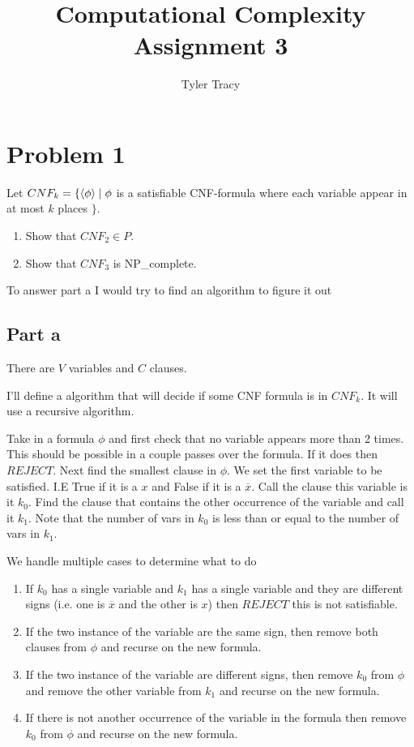 \documentclass[12pt]{article}
\title{Computational Complexity Assignment 3}
\author{Tyler Tracy}
\begin{document}
\maketitle

\section*{Problem 1}

\begin{questionbox}
	Let $CNF_k = \{ \braket{\phi} \mid \phi$ is a satisfiable CNF-formula where each variable appear in at most $k$ places $\}$.
	\begin{enumerate}[label=(\alph*)]
		\item Show that $CNF_2 \in P$.
		\item Show that $CNF_3$ is NP\_complete.
	\end{enumerate}
\end{questionbox}


To answer part a I would try to find an algorithm to figure it out

\subsection*{Part a}

There are $V$ variables and $C$ clauses.

I'll define a algorithm that will decide if some CNF formula is in $CNF_k$. It will use a recursive algorithm.


Take in a formula $\phi$ and first check that no variable appears more than 2 times. This should be possible in a couple passes over the formula. If it does then $REJECT$. Next find the smallest clause in $\phi$. We set the first variable to be satisfied. I.E True if it is a $x$ and False if it is a $\overline{x}$. Call the clause this variable is it $k_0$. Find the clause that contains the other occurrence of the variable and call it $k_1$. Note that the number of vars in $k_0$ is less than or equal to the number of vars in $k_1$.

We handle multiple cases to determine what to do

\begin{enumerate}
	\item If $k_0$ has a single variable and $k_1$ has a single variable and they are different signs (i.e. one is $\overline{x}$ and the other is $x$) then $REJECT$ this is not satisfiable.
	\item If the two instance of the variable are the same sign, then remove both clauses from $\phi$ and recurse on the new formula.
	\item If the two instance of the variable are different signs, then remove $k_0$ from $\phi$ and remove the other variable from $k_1$ and recurse on the new formula.
	\item If there is not another occurrence of the variable in the formula then remove $k_0$ from $\phi$ and recurse on the new formula.

\end{enumerate}
\end{document}
